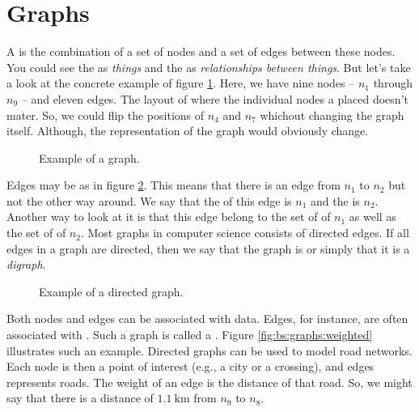 \section{Graphs}
\label{sec:bg:graph}

A  is the combination of a set of nodes and a set of edges between these nodes. You could see the  as \textsl{things} and the  as \textsl{relationships between things}. But let's take a look at the concrete example of figure \ref{fig:bs:graphs:graph}. Here, we have nine nodes -- $n_1$ through $n_9$ -- and eleven edges. The layout of where the individual nodes a placed doesn't mater. So, we could flip the positions of $n_4$ and $n_7$ whichout changing the graph itself. Although, the representation of the graph would obviously change.

\begin{figure}[tbp]
  
  \caption{Example of a graph.}
  \label{fig:bs:graphs:graph}
\end{figure}

Edges may be  as in figure \ref{fig:bs:graphs:directed}. This means that there is an edge from $n_1$ to $n_2$ but not the other way around. We say that the  of this edge is $n_1$ and the  is $n_2$. Another way to look at it is that this edge belong to the set of  of $n_1$ as well as the set of  of $n_2$. Most graphs in computer science consists of directed edges. If all edges in a graph are directed, then we say that the graph is  or simply that it is a \textsl{digraph}.

\begin{figure}[tbp]
  
  \caption{Example of a directed graph.}
  \label{fig:bs:graphs:directed}
\end{figure}

Both nodes and edges can be associated with data. Edges, for instance, are often associated with . Such a graph is called a . Figure \ref{fig:bs:graphs:weighted} illustrates such an example. Directed graphs can be used to model road networks. Each node is then a point of interest (e.g., a city or a crossing), and edges represents roads. The weight of an edge is the distance of that road. So, we might say that there is a distance of $1.1~\mathrm{km}$ from $n_9$ to $n_8$.

